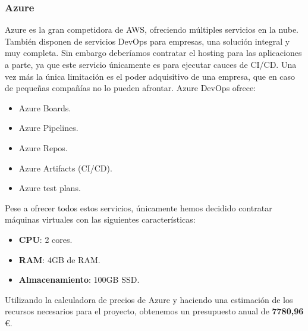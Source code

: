 		\subsubsection{Azure}
			\begin{text}
				Azure es la gran competidora de AWS, ofreciendo múltiples servicios en la nube. También disponen de servicios DevOps \cite{AzureDev63:online} para empresas, una solución integral y muy completa. Sin embargo deberíamos contratar el hosting para las aplicaciones a parte, ya que este servicio únicamente es para ejecutar cauces de CI/CD. Una vez más la única limitación es el poder adquisitivo de una empresa, que en caso de pequeñas compañías no lo pueden afrontar. Azure DevOps ofrece:
				\begin{itemize}
					\item Azure Boards.
					\item Azure Pipelines.
					\item Azure Repos.
					\item Azure Artifacts (CI/CD).
					\item Azure test plans.
				\end{itemize}
			
			Pese a ofrecer todos estos servicios, únicamente hemos decidido contratar máquinas virtuales con las siguientes características:
			
			\begin{itemize}
				\item \textbf{CPU}: 2 cores.
				\item \textbf{RAM}: 4GB de RAM.
				\item \textbf{Almacenamiento}: 100GB SSD.
			\end{itemize}
		
				Utilizando la calculadora de precios de Azure \cite{azurecalculadora:online} y haciendo una estimación de los recursos necesarios para el proyecto, obtenemos un presupuesto anual de \textbf{7780,96} \space \euro.
			\end{text}
	
		

